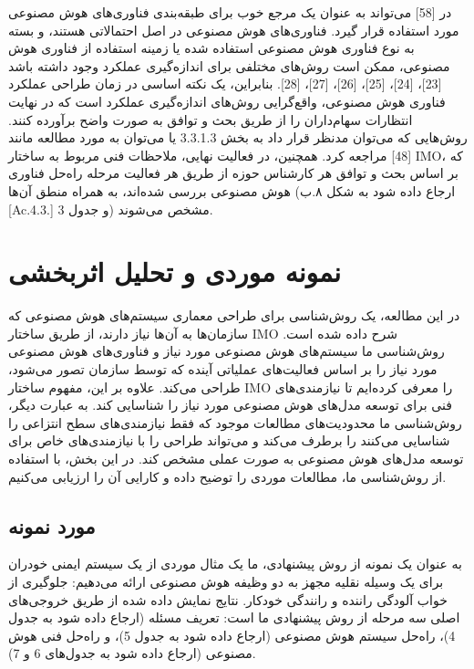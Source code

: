 \documentclass[a4paper,10pt]{article}
\begin{document}
در [58] می‌تواند به عنوان یک مرجع خوب برای طبقه‌بندی فناوری‌های هوش مصنوعی مورد استفاده قرار گیرد. فناوری‌های هوش مصنوعی در اصل احتمالاتی هستند، و بسته به نوع فناوری هوش مصنوعی استفاده شده یا زمینه استفاده از فناوری هوش مصنوعی، ممکن است روش‌های مختلفی برای اندازه‌گیری عملکرد وجود داشته باشد [23]، [24]، [25]، [26]، [27]، [28]. بنابراین، یک نکته اساسی در زمان طراحی عملکرد فناوری هوش مصنوعی، واقع‌گرایی روش‌های اندازه‌گیری عملکرد است که در نهایت انتظارات سهام‌داران را از طریق بحث و توافق به صورت واضح برآورده کنند. روش‌هایی که می‌توان مدنظر قرار داد به بخش 3.3.1.3 یا می‌توان به مورد مطالعه مانند [48] مراجعه کرد. همچنین، در فعالیت نهایی، ملاحظات فنی مربوط به ساختار IMO، که بر اساس بحث و توافق هر کارشناس حوزه از طریق هر فعالیت مرحله راه‌حل فناوری هوش مصنوعی بررسی شده‌اند، به همراه منطق آن‌ها (ارجاع داده شود به شکل ۸.ب [Ac.4.3.] و جدول 3) مشخص می‌شوند.

    \section{نمونه موردی و تحلیل اثربخشی}

        در این مطالعه، یک روش‌شناسی برای طراحی معماری سیستم‌های هوش مصنوعی که سازمان‌ها به آن‌ها نیاز دارند، از طریق ساختار IMO شرح داده شده است. روش‌شناسی ما سیستم‌های هوش مصنوعی مورد نیاز و فناوری‌های هوش مصنوعی مورد نیاز را بر اساس فعالیت‌های عملیاتی آینده که توسط سازمان تصور می‌شود، طراحی می‌کند. علاوه بر این، مفهوم ساختار IMO را معرفی کرده‌ایم تا نیازمندی‌های فنی برای توسعه مدل‌های هوش مصنوعی مورد نیاز را شناسایی کند. به عبارت دیگر، روش‌شناسی ما محدودیت‌های مطالعات موجود که فقط نیازمندی‌های سطح انتزاعی را شناسایی می‌کنند را برطرف می‌کند و می‌تواند طراحی را با نیازمندی‌های خاص برای توسعه مدل‌های هوش مصنوعی به صورت عملی مشخص کند. در این بخش، با استفاده از روش‌شناسی ما، مطالعات موردی را توضیح داده و کارایی آن را ارزیابی می‌کنیم.

        \subsection{مورد نمونه}

            به عنوان یک نمونه از روش پیشنهادی، ما یک مثال موردی از یک سیستم ایمنی خودران برای یک وسیله نقلیه مجهز به دو وظیفه هوش مصنوعی ارائه می‌دهیم: جلوگیری از خواب آلودگی راننده و رانندگی خودکار. نتایج نمایش داده شده از طریق خروجی‌های اصلی سه مرحله از روش پیشنهادی ما است: تعریف مسئله (ارجاع داده شود به جدول 4)، راه‌حل سیستم هوش مصنوعی (ارجاع داده شود به جدول 5)، و راه‌حل فنی هوش مصنوعی (ارجاع داده شود به جدول‌های 6 و 7).
\end{document}
